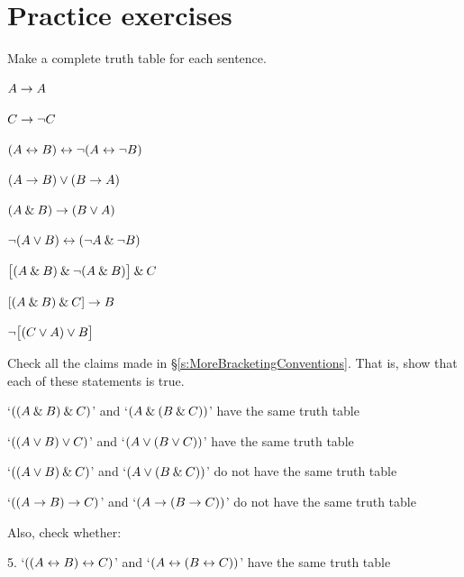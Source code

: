 




\section{Practice exercises}\label{pr.TT.TTorC}
\setcounter{ProbPart}{0}

\problempart
Make a complete truth table for each sentence.
\begin{earg}
\item $A \rightarrow A$ %
\item $C \rightarrow{\neg} C$ %
\item $(A \leftrightarrow B) \leftrightarrow {\neg}(A\leftrightarrow {\neg} B)$ %
\item $(A \rightarrow B) \vee (B \rightarrow A)$ %
\item $(A \mathbin{\&} B) \rightarrow (B \vee A)$  %
\item ${\neg}(A \vee B) \leftrightarrow ({\neg} A \mathbin{\&} {\neg} B)$ %
\item $\bigl[(A\mathbin{\&} B) \mathbin{\&}{\neg}(A\mathbin{\&} B)\bigr] \mathbin{\&} C$ %
\item $[(A \mathbin{\&} B) \mathbin{\&} C] \rightarrow B$ %
\item ${\neg}\bigl[(C\vee A) \vee B\bigr]$ %
\end{earg}

\problempart
Check all the claims made in \S\ref{s:MoreBracketingConventions}. That is, show that each of these statements is true.
\begin{earg}
	\item `$((A \mathbin{\&} B) \mathbin{\&} C)$' and `$(A \mathbin{\&} (B \mathbin{\&} C))$' have the same truth table
	\item `$((A \vee B) \vee C)$' and `$(A \vee (B \vee C))$' have the same truth table
	\item `$((A \vee B) \mathbin{\&} C)$' and `$(A \vee (B \mathbin{\&} C))$' do not have the same truth table
	\item `$((A \rightarrow B) \rightarrow C)$' and `$(A \rightarrow (B \rightarrow C))$' do not have the same truth table
\end{earg}
Also, check whether:
\begin{earg}
	\item[5.] `$((A \leftrightarrow B) \leftrightarrow C)$' and `$(A \leftrightarrow (B \leftrightarrow C))$' have the same truth table
\end{earg}

